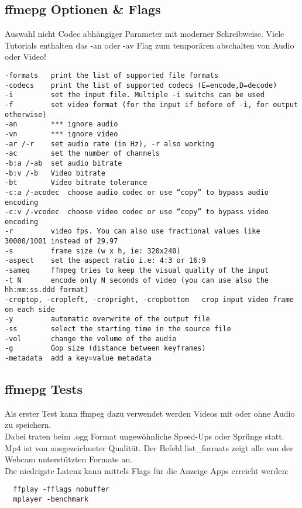 \subsection{ffmepg Optionen \& Flags}
Auswahl nicht Codec abhängiger Parameter mit moderner Schreibweise. Viele Tutorials enthalten das -an oder -av Flag zum temporären abschalten von Audio oder Video!
\begin{verbatim}
-formats   print the list of supported file formats
-codecs    print the list of supported codecs (E=encode,D=decode)
-i         set the input file. Multiple -i switchs can be used
-f         set video format (for the input if before of -i, for output otherwise)
-an        *** ignore audio
-vn        *** ignore video
-ar /-r    set audio rate (in Hz), -r also working
-ac        set the number of channels
-b:a /-ab  set audio bitrate
-b:v /-b   Video bitrate
-bt        Video bitrate tolerance
-c:a /-acodec  choose audio codec or use “copy” to bypass audio encoding
-c:v /-vcodec  choose video codec or use “copy” to bypass video encoding
-r         video fps. You can also use fractional values like 30000/1001 instead of 29.97
-s         frame size (w x h, ie: 320x240)
-aspect    set the aspect ratio i.e: 4:3 or 16:9
-sameq     ffmpeg tries to keep the visual quality of the input
-t N       encode only N seconds of video (you can use also the hh:mm:ss.ddd format)
-croptop, -cropleft, -cropright, -cropbottom   crop input video frame on each side
-y         automatic overwrite of the output file
-ss        select the starting time in the source file
-vol       change the volume of the audio
-g         Gop size (distance between keyframes)
-metadata  add a key=value metadata
\end{verbatim}

\subsection{ffmepg Tests}
Als erster Test kann ffmpeg dazu verwendet werden Videos mit oder ohne Audio zu speichern.\\
Dabei traten beim .ogg Format ungewöhnliche Speed-Ups oder Sprünge statt. Mp4 ist von 
ausgezeichneter Qualität. Der Befehl list\_formats zeigt alle von der Webcam unterstützten 
Formate an.\\

Die niedrigste Latenz kann mittels Flags für die Anzeige Apps erreicht werden:
\begin{verbatim}
  ffplay -fflags nobuffer 
  mplayer -benchmark
\end{verbatim}

